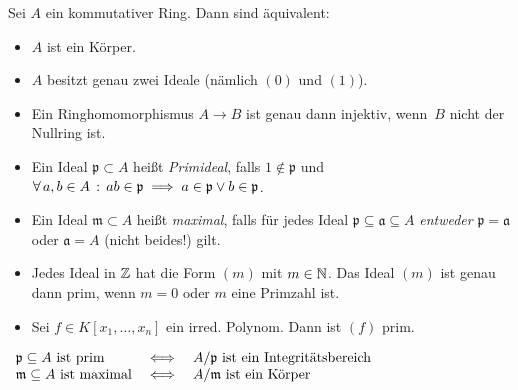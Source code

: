 \documentclass{cheat-sheet}
\newcommand{\aaa}{\mathfrak{a}}
\newcommand{\ppp}{\mathfrak{p}}
\newcommand{\mmm}{\mathfrak{m}}
\begin{document}

\begin{prop}
  Sei $A$ ein kommutativer Ring.
  Dann sind äquivalent:
  \begin{itemize}
    \item $A$ ist ein Körper.
    \item $A$ besitzt genau zwei Ideale (nämlich $(0)$ und $(1)$).
    \item Ein Ringhomomorphismus $A \to B$ ist genau dann injektiv, wenn~$B$ nicht der Nullring ist.
  \end{itemize}
\end{prop}


\begin{defn}
  \begin{itemize}
    \item Ein Ideal $\ppp \subset A$ heißt \emph{Primideal}, falls $1 \not\in \ppp$ und $\fa{a, b \in A} ab \in \ppp \implies a \in \ppp \vee b \in \ppp$.
    \item Ein Ideal $\mmm \subset A$ heißt \emph{maximal}, falls für jedes Ideal $\ppp \subseteq \aaa \subseteq A$ \textit{entweder} $\ppp = \aaa$ oder $\aaa = A$ (nicht beides!) gilt.
  \end{itemize}
\end{defn}

\begin{bspe}
  \begin{itemize}
    \item Jedes Ideal in $\mathbb{Z}$ hat die Form $(m)$ mit $m \in \mathbb{N}$.
    Das Ideal $(m)$ ist genau dann prim, wenn $m=0$ oder $m$ eine Primzahl ist.
    \item Sei $f \in K[x_1, \ldots, x_n]$ ein irred. Polynom.
    Dann ist $(f)$ prim.
\end{itemize}
\end{bspe}

\begin{lem}
  \begin{minipage}[t]{0.85 \linewidth}
    $
      \begin{array}[t]{l c l}
        \text{$\ppp \subseteq A$ ist prim} & \iff & \text{$A/\ppp$ ist ein Integritätsbereich} \\
        \text{$\mmm \subseteq A$ ist maximal} & \iff & \text{$A/\mmm$ ist ein Körper} \\
      \end{array}
    $
  \end{minipage}
\end{lem}
\end{document}
